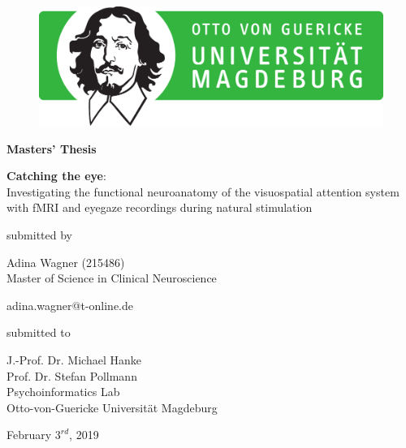 \documentclass[a4paper, 12pt]{scrreprt}
\begin{document}

\begin{figure}[h]
\vspace{-1.5cm}
\hspace{9.5cm}
\includegraphics[scale=0.5]{img/ovgu_nat_logo}
\label{logoOVGU}
\end{figure}

\begin{center}
\bigskip
\begin{LARGE}
\textbf{Masters' Thesis}
\end{LARGE}

\vspace{\fill}

\begin{huge}
 
\textbf{Catching the eye}: \\
Investigating the functional neuroanatomy of the visuospatial attention system with fMRI and eyegaze recordings during natural stimulation

\end{huge}

\vspace{\fill}

submitted by\\
\begin{large}
Adina Wagner (215486) \\
\vspace{0.3cm}
Master of Science in Clinical Neuroscience\\
\begin{normalsize}
adina.wagner@t-online.de 
\end{normalsize}

\vspace{\fill}

\begin{normalsize}
submitted to\\
\end{normalsize}
J.-Prof. Dr. Michael Hanke\\
Prof. Dr. Stefan Pollmann\\
\vspace{0.5cm}
Psychoinformatics Lab\\
Otto-von-Guericke Universität Magdeburg\\
\end{large}

\vspace{1cm}

February $3^{rd}$, 2019

\thispagestyle{empty}
\end{center}
\clearpage
\end{document}
